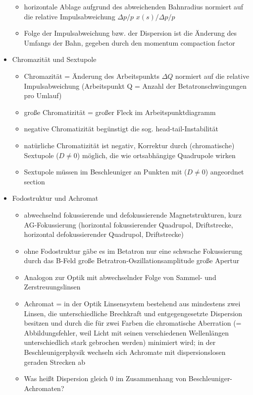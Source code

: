 \documentclass[11pt,a4paper]{article}
\begin{document}
\begin{itemize}
            \begin{itemize}
                \item horizontale Ablage aufgrund des abweichenden Bahnradius normiert auf die relative Impulsabweichung \( \Delta p/p \) \( x(s) / \Delta p /p \)
                \item Folge der Impulsabweichung bzw. der Dispersion ist die Änderung des Umfangs der Bahn, gegeben durch den momentum compaction factor
            \end{itemize}
        \item Chromazität und Sextupole
            \begin{itemize}
                \item Chromazität = Änderung des Arbeitspunkts \( \Delta Q\) normiert auf die relative Impulsabweichung 
                (Arbeitspunkt Q = Anzahl der Betatronschwingungen pro Umlauf)
                \item große Chromatizität = großer Fleck im Arbeitspunktdiagramm
                \item negative Chromatizität begünstigt die sog. head-tail-Instabilität
                \item natürliche Chromatizität ist negativ, Korrektur durch (chromatische) Sextupole (\(D \neq 0\)) möglich, die wie ortsabhängige 
                Quadrupole wirken
                \item Sextupole müssen im Beschleuniger an Punkten mit (\(D \neq 0\)) angeordnet section
            \end{itemize}
        \item Fodostruktur und Achromat
            \begin{itemize}
                \item abwechselnd fokussierende und defokussierende Magnetstrukturen, kurz AG-Fokussierung (horizontal fokussierender Quadrupol, Driftstrecke, 
                horizontal defokussierender Quadrupol, Driftstrecke)
                \item ohne Fodostruktur gäbe es im Betatron nur eine schwache Fokussierung durch das B-Feld 
                \rightarrow große Betratron-Oszillationsamplitude \rightarrow große Apertur
                \item Analogon zur Optik mit abwechselnder Folge von Sammel- und Zerstreuungslinsen
                \item Achromat = in der Optik Linsensystem bestehend aus mindestens zwei Linsen, die unterschiedliche Brechkraft und entgegengesetzte 
                Dispersion besitzen und durch die für zwei Farben die chromatische Aberration (= Abbildungsfehler, weil Licht mit seinen 
                verschiedenen Wellenlängen unterschiedlich stark gebrochen werden) minimiert wird; in der Beschleunigerphysik wechseln sich Achromate
                mit dispersionslosen geraden Strecken ab
                \item Was heißt Dispersion gleich 0 im Zusammenhang von Beschleuniger-Achromaten?
            \end{itemize}
    \end{itemize}
\end{document}
